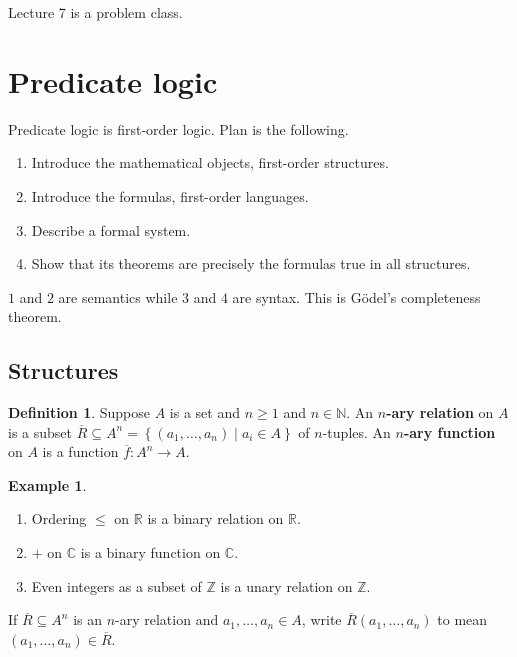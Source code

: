 \documentclass{article}
\newcommand{\N}{\mathbb{N}}
\newcommand{\Z}{\mathbb{Z}}
\newcommand{\R}{\mathbb{R}}
\newcommand{\C}{\mathbb{C}}
\newcommand{\rb}[1]{\left( #1 \right)}
\newcommand{\cb}[1]{\left\{ #1 \right\}}
\theoremstyle{definition}\newtheorem{definition}{Definition}[subsection]
\theoremstyle{definition}\newtheorem{remark}[definition]{Remark}
\theoremstyle{definition}\newtheorem*{example}{Example}
\theoremstyle{definition}\newtheorem*{note}{Note}
\begin{document}
Lecture 7 is a problem class.


\section{Predicate logic}

Predicate logic is first-order logic. Plan is the following.
\begin{enumerate}
\item Introduce the mathematical objects, first-order structures.
\item Introduce the formulas, first-order languages.
\item Describe a formal system.
\item Show that its theorems are precisely the formulas true in all structures.
\end{enumerate}
$ 1 $ and $ 2 $ are semantics while $ 3 $ and $ 4 $ are syntax. This is Gödel's completeness theorem.

\subsection{Structures}

\begin{definition}
Suppose $ A $ is a set and $ n \ge 1 $ and $ n \in \N $. An \textbf{$ n $-ary relation} on $ A $ is a subset $ \overline{R} \subseteq A^n = \cb{\rb{a_1, \dots, a_n} \mid a_i \in A} $ of $ n $-tuples. An \textbf{$ n $-ary function} on $ A $ is a function $ \overline{f} : A^n \to A $.
\end{definition}

\begin{example}
\hfill
\begin{enumerate}
\item Ordering $ \le $ on $ \R $ is a binary relation on $ \R $.
\item $ + $ on $ \C $ is a binary function on $ \C $.
\item Even integers as a subset of $ \Z $ is a unary relation on $ \Z $.
\end{enumerate}
\end{example}

If $ \overline{R} \subseteq A^n $ is an $ n $-ary relation and $ a_1, \dots, a_n \in A $, write $ \overline{R}\rb{a_1, \dots, a_n} $ to mean $ \rb{a_1, \dots, a_n} \in \overline{R} $.
\end{document}
